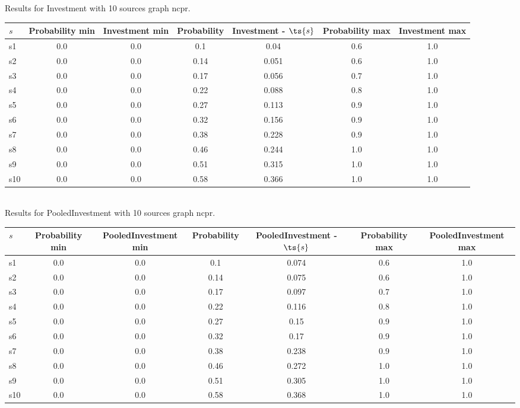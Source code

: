 \documentclass{article}
\begin{document}
\noindent Results for Investment with 10 sources graph ncpr.

\noindent\begin{tabular}{|l|c|c|c|c|c|c|}
\hline
$s$& Probability min & Investment min & Probability & Investment - $\ts{s}$ & Probability max & Investment max\\
\hline
s1 &0.0 & 0.0 & 0.1 & 0.04 & 0.6 & 1.0\\
\hline
s2 &0.0 & 0.0 & 0.14 & 0.051 & 0.6 & 1.0\\
\hline
s3 &0.0 & 0.0 & 0.17 & 0.056 & 0.7 & 1.0\\
\hline
s4 &0.0 & 0.0 & 0.22 & 0.088 & 0.8 & 1.0\\
\hline
s5 &0.0 & 0.0 & 0.27 & 0.113 & 0.9 & 1.0\\
\hline
s6 &0.0 & 0.0 & 0.32 & 0.156 & 0.9 & 1.0\\
\hline
s7 &0.0 & 0.0 & 0.38 & 0.228 & 0.9 & 1.0\\
\hline
s8 &0.0 & 0.0 & 0.46 & 0.244 & 1.0 & 1.0\\
\hline
s9 &0.0 & 0.0 & 0.51 & 0.315 & 1.0 & 1.0\\
\hline
s10 &0.0 & 0.0 & 0.58 & 0.366 & 1.0 & 1.0\\
\hline
\end{tabular}\\

\noindent Results for PooledInvestment with 10 sources graph ncpr.

\noindent\begin{tabular}{|l|c|c|c|c|c|c|}
\hline
$s$& Probability min & PooledInvestment min & Probability & PooledInvestment - $\ts{s}$ & Probability max & PooledInvestment max\\
\hline
s1 &0.0 & 0.0 & 0.1 & 0.074 & 0.6 & 1.0\\
\hline
s2 &0.0 & 0.0 & 0.14 & 0.075 & 0.6 & 1.0\\
\hline
s3 &0.0 & 0.0 & 0.17 & 0.097 & 0.7 & 1.0\\
\hline
s4 &0.0 & 0.0 & 0.22 & 0.116 & 0.8 & 1.0\\
\hline
s5 &0.0 & 0.0 & 0.27 & 0.15 & 0.9 & 1.0\\
\hline
s6 &0.0 & 0.0 & 0.32 & 0.17 & 0.9 & 1.0\\
\hline
s7 &0.0 & 0.0 & 0.38 & 0.238 & 0.9 & 1.0\\
\hline
s8 &0.0 & 0.0 & 0.46 & 0.272 & 1.0 & 1.0\\
\hline
s9 &0.0 & 0.0 & 0.51 & 0.305 & 1.0 & 1.0\\
\hline
s10 &0.0 & 0.0 & 0.58 & 0.368 & 1.0 & 1.0\\
\hline
\end{tabular}\\
\end{document}
